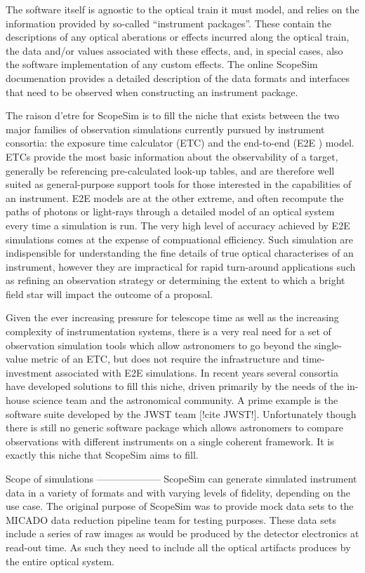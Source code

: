 The software itself is agnostic to the optical train it must model, and
relies on the information provided by so-called ``instrument packages''.
These contain the descriptions of any optical aberations or effects incurred
along the optical train, the data and/or values associated with these
effects, and, in special cases, also the software implementation of any
custom effects. The online ScopeSim documenation provides a detailed
description of the data formats and interfaces that need to be observed when
constructing an instrument package.

The raison d'etre for ScopeSim is to fill the niche that exists between the
two major families of observation simulations currently pursued by instrument
consortia: the exposure time calculator (ETC) and the end-to-end (E2E ) model.
ETCs provide the most basic information about the observability of a target,
generally be referencing pre-calculated look-up tables, and are therefore
well suited as general-purpose support tools for those interested in the
capabilities of an instrument. E2E models are at the other extreme, and
often recompute the paths of photons or light-rays through a detailed model
of an optical system every time a simulation is run. The very high level of
accuracy achieved by E2E simulations comes at the expense of compuational
efficiency. Such simulation are indispensible for understanding the fine
details of true optical characterises of an instrument, however they are
impractical for rapid turn-around applications such as refining an
observation strategy or determining the extent to which a bright field star
will impact the outcome of a proposal.

Given the ever increasing pressure for telescope time as well as the
increasing complexity of instrumentation systems, there is a very real need
for a set of observation simulation tools which allow astronomers to go
beyond the single-value metric of an ETC, but does not require the
infrastructure and time-investment associated with E2E simulations. In recent
years several consortia have developed solutions to fill this niche, driven
primarily by the needs of the in-house science team and the astronomical
community. A prime example is the software suite developed by the JWST team
[!cite JWST!]. Unfortunately though there is still no generic software
package which allows astronomers to compare observations with different
instruments on a single coherent framework. It is exactly this niche that
ScopeSim aims to fill.


Scope of simulations
--------------------
ScopeSim can generate simulated instrument data in a variety of formats and
with varying levels of fidelity, depending on the use case. The original purpose
of ScopeSim was to provide mock data sets to the MICADO data reduction pipeline
team for testing purposes. These data sets include a series of raw images as
would be produced by the detector electronics at read-out time. As such they
need to include all the optical artifacts produces by the entire optical system.

